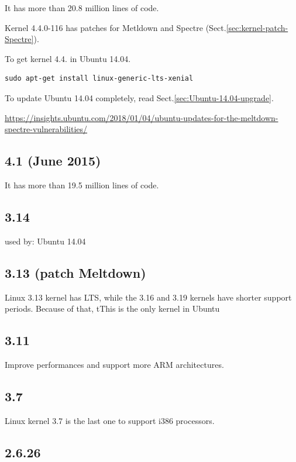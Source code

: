 It has more than 20.8 million lines of code.

Kernel 4.4.0-116 has patches for Metldown and Spectre
(Sect.\ref{sec:kernel-patch-Spectre}).

To get kernel 4.4. in Ubuntu 14.04. 
\begin{verbatim}
sudo apt-get install linux-generic-lts-xenial
\end{verbatim}

To update Ubuntu 14.04 completely, read Sect.\ref{sec:Ubuntu-14.04-upgrade}.

\url{https://insights.ubuntu.com/2018/01/04/ubuntu-updates-for-the-meltdown-spectre-vulnerabilities/}

\subsection{4.1 (June 2015)}

It has more than 19.5 million lines of code.

\subsection{3.14}

used by: Ubuntu 14.04


\subsection{3.13 (patch Meltdown)}


Linux 3.13 kernel has LTS, while the 3.16 and 3.19 kernels have shorter support
periods. Because of that, tThis is the only kernel in Ubuntu 

\subsection{3.11}

Improve performances and support more ARM architectures. 

\subsection{3.7}

Linux kernel 3.7 is the last one to support i386 processors. 


\subsection{2.6.26}

